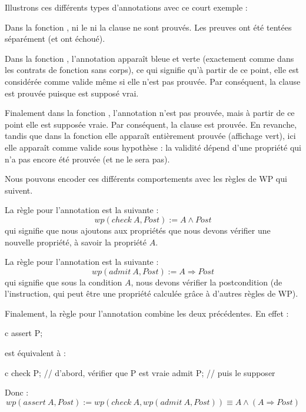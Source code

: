 Illustrons ces différents types d'annotations avec ce court exemple :






Dans la fonction , ni le  ni la
clause  ne sont prouvés. Les preuves ont été tentées
séparément (et ont échoué).


Dans la fonction , l'annotation 
apparaît bleue et verte (exactement comme dans les contrats de fonction sans
corps), ce qui signifie qu'à partir de ce point, elle est considérée comme
valide même si elle n'est pas prouvée. Par conséquent, la clause
 est prouvée puisque  est
supposé vrai.


Finalement dans la fonction , l'annotation
 n'est pas prouvée, mais à partir de ce point elle est
supposée vraie. Par conséquent, la clause  est prouvée.
En revanche, tandis que dans la fonction  elle
apparaît entièrement prouvée (affichage vert), ici elle apparaît comme valide
sous hypothèse : la validité dépend d'une propriété qui n'a pas encore été
prouvée (et ne le sera pas).


Nous pouvons encoder ces différents comportements avec les règles de WP qui
suivent.


La règle pour l'annotation  est la suivante :
$$ wp(check\ A, Post) := A \wedge Post $$
qui signifie que nous ajoutons aux propriétés que nous devons vérifier une
nouvelle propriété, à savoir la propriété $A$.


La règle pour l'annotation  est la suivante :
$$ wp(admit\ A, Post) := A \Rightarrow Post $$
qui signifie que sous la condition $A$, nous devons vérifier la postcondition
(de l'instruction, qui peut être une propriété calculée grâce à d'autres règles
de WP).


Finalement, la règle pour l'annotation  combine les deux
précédentes. En effet :
\begin{CodeBlock}{c}
  assert P;
\end{CodeBlock}
est équivalent à :
\begin{CodeBlock}{c}
  check P; // d'abord, vérifier que P est vraie
  admit P; // puis le supposer
\end{CodeBlock}
Donc :
$$ wp(assert\ A, Post) := wp(check\ A, wp(admit\ A, Post)) \equiv A \wedge (A \Rightarrow Post) $$


